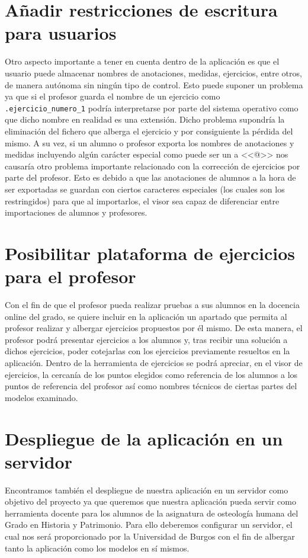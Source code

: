 \section{Añadir restricciones de escritura para usuarios}
Otro aspecto importante a tener en cuenta dentro de la aplicación es que el usuario puede almacenar nombres de anotaciones, medidas, ejercicios, entre otros, de manera autónoma sin ningún tipo de control. Esto puede suponer un problema ya que si el profesor guarda el nombre de un ejercicio como \texttt{.ejercicio\_numero\_1} podría interpretarse por parte del sistema operativo como que dicho nombre en realidad es una extensión. Dicho problema supondría la eliminación del fichero que alberga el ejercicio y por consiguiente la pérdida del mismo. A su vez, si un alumno o profesor exporta los nombres de anotaciones y medidas incluyendo algún carácter especial como puede ser un a <<@>> nos causaría otro problema importante relacionado con la corrección de ejercicios por parte del profesor. Esto es debido a que las anotaciones  de alumnos a la hora de ser exportadas se guardan con ciertos caracteres especiales (los cuales son los restringidos) para que al importarlos, el visor sea capaz de diferenciar entre importaciones de alumnos y profesores.

\section{Posibilitar plataforma de ejercicios para el profesor}
Con el fin de que el profesor pueda realizar pruebas a sus alumnos en la docencia online del grado, se quiere incluir en la aplicación un apartado que permita al profesor realizar y albergar ejercicios propuestos por él mismo. De esta manera, el profesor podrá presentar ejercicios a los alumnos y, tras recibir una solución a dichos ejercicios, poder cotejarlas con los ejercicios previamente resueltos en la aplicación. Dentro de la herramienta de ejercicios se podrá apreciar, en el visor de ejercicios, la cercanía de los puntos elegidos como referencia de los alumnos a los puntos de referencia del profesor así como nombres técnicos de ciertas partes del modelos examinado.

\section{Despliegue de la aplicación en un servidor}
Encontramos también el despliegue de nuestra aplicación en un servidor como objetivo del proyecto ya que queremos que nuestra aplicación pueda servir como herramienta docente para los alumnos de la asignatura de osteología humana del Grado en Historia y Patrimonio. Para ello deberemos configurar un servidor, el cual nos será proporcionado por la Universidad de Burgos con el fin de albergar tanto la aplicación como los modelos en sí mismos.

